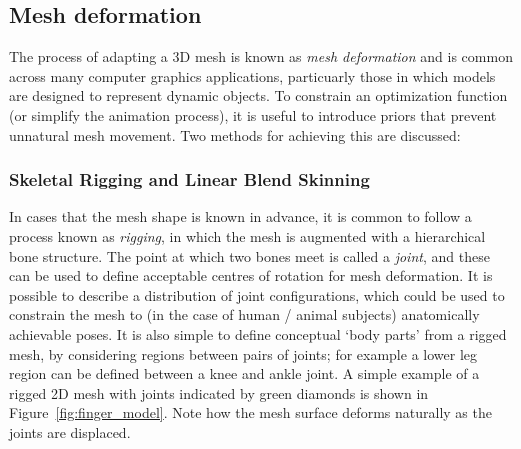     
    \subsection{Mesh deformation}
    The process of adapting a 3D mesh is known as \textit{mesh deformation} and is common across many computer graphics applications, particuarly those in which models are designed to represent dynamic objects. To constrain an optimization function (or simplify the animation process), it is useful to introduce priors that prevent unnatural mesh movement. Two methods for achieving this are discussed:

        \subsubsection{Skeletal Rigging and Linear Blend Skinning}
        In cases that the mesh shape is known in advance, it is common to follow a process known as \textit{rigging}, in which the mesh is augmented with a hierarchical bone structure. The point at which two bones meet is called a \emph{joint}, and these can be used to define acceptable centres of rotation for mesh deformation. It is possible to describe a distribution of joint configurations, which could be used to constrain the mesh to (in the case of human / animal subjects) anatomically achievable poses. It is also simple to define conceptual `body parts' from a rigged mesh, by considering regions between pairs of joints; for example a lower leg region can be defined between a knee and ankle joint. A simple example of a rigged 2D mesh with joints indicated by green diamonds is shown in Figure~\ref{fig:finger_model}. Note how the mesh surface deforms naturally as the joints are displaced.
        
